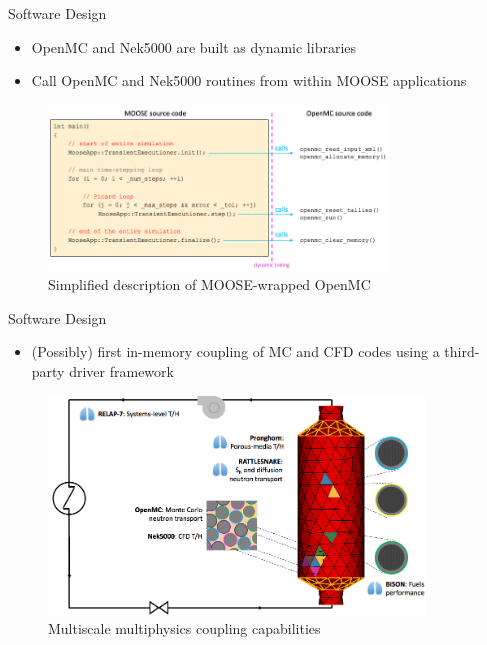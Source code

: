 \documentclass[10pt]{beamer}
\begin{document}
\begin{frame}{Software Design}
\begin{itemize}
\item OpenMC and Nek5000 are built as dynamic libraries
\item Call OpenMC and Nek5000 routines from within MOOSE applications
\end{itemize}
\begin{figure}
\includegraphics[width=9cm]{../Figures/moose_driver.png}
\caption{Simplified description of MOOSE-wrapped OpenMC}
\end{figure}
\end{frame}

\begin{frame}{Software Design}
\begin{itemize}
\item (Possibly) first in-memory coupling of MC and CFD codes using a third-party driver framework
\end{itemize}

\begin{figure}
\includegraphics[width=10cm]{../Figures/MOOSE_capabilities.png}
\caption{Multiscale multiphysics coupling capabilities}
\end{figure}
\end{frame}
\end{document}
